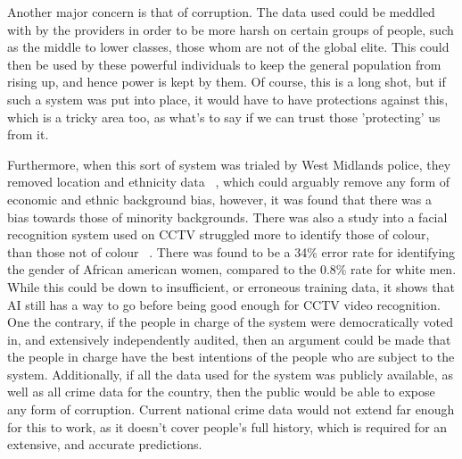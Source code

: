 Another major concern is that of corruption.
The data used could be meddled with by the providers in order to be more harsh on certain groups of people, such as
the middle to lower classes, those whom are not of the global elite.
This could then be used by these powerful individuals to keep the general population from rising up, and hence power
is kept by them.
Of course, this is a long shot, but if such a system was put into place, it would have to have protections against
this, which is a tricky area too, as what's to say if we can trust those 'protecting' us from it.

Furthermore, when this sort of system was trialed by West Midlands police, they removed location and ethnicity data
~\cite{wmp-trial}, which could arguably remove any form of economic and ethnic background bias, however, it was
found that there was a bias towards those of minority backgrounds.
There was also a study into a facial recognition system used on CCTV struggled more to identify those of colour,
than those not of colour ~\cite{ifsec-bias-article}.
There was found to be a 34\% error rate for identifying the gender of African american women, compared to the
0.8\% rate for white men.
While this could be down to insufficient, or erroneous training data, it shows that AI still has a way to go before
being good enough for CCTV video recognition.
\\

One the contrary, if the people in charge of the system were democratically voted in, and extensively independently
audited, then an argument could be made that the people in charge have the best intentions of the people who are
subject to the system.
Additionally, if all the data used for the system was publicly available, as well as all crime data for the
country, then the public would be able to expose any form of corruption.
Current national crime data would not extend far enough for this to work, as it doesn't cover people's full history,
which is required for an extensive, and accurate predictions.

